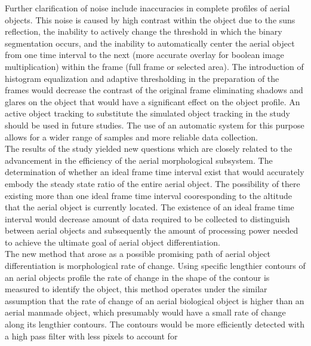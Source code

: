 Further clarification of noise include inaccuracies in complete profiles of aerial objects. This noise is caused by high contrast within the object due to the suns reflection, the inability to actively change the threshold in which the binary segmentation occurs, and the inability to automatically center the aerial object from one time interval to the next (more accurate overlay for boolean image multiplication) within the frame (full frame or selected area). The introduction of histogram equalization and adaptive thresholding in the preparation of the frames would decrease the contrast of the original frame eliminating shadows and glares on the object that would have a significant effect on the object profile. An active object tracking to substitute the simulated object tracking in the study should be used in future studies. The use of an automatic system for this purpose allows for a wider range of samples and more reliable data collection.\\
\indent The results of the study yielded new questions which are closely related to the advancement in the efficiency of the aerial morphological subsystem. The determination of whether an ideal frame time interval exist that would accurately embody the steady state ratio of the entire aerial object. The possibility of there existing more than one ideal frame time interval
cooresponding to the altitude that the aerial object is currently located. The existence of an ideal frame time interval would decrease amount of data required to be collected to distinguish between aerial objects and subsequently the amount of processing power needed to achieve the ultimate goal of aerial object differentiation.\\     
\indent The new method that arose as a possible promising path of aerial object differentiation is morphological rate of change. Using specific lengthier contours of an aerial objects profile the rate of change in the shape of the contour is measured to identify the object, this method operates under the similar assumption that the rate of change of an aerial biological object is higher than an aerial manmade object, which presumably would have a small rate of change along its lengthier contours. The contours would be more efficiently detected with a high pass filter with less pixels to account for \\


